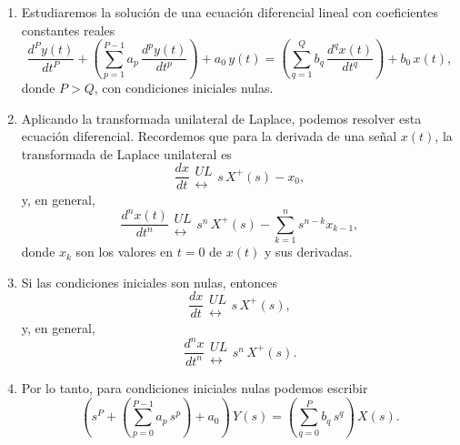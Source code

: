 \begin{enumerate}

\item Estudiaremos la soluci\'{o}n de una ecuaci\'{o}n diferencial lineal con coeficientes constantes reales
\begin{equation}
   \frac{d^{P}y\left( t\right) }{dt^{P}} +
   \left(\sum_{p=1}^{P-1}a_{p} \, \frac{d^{p}y\left( t\right) }{dt^{p}}\right) + a_{0} \, y(t)= 
     \left(\sum_{q=1}^{Q}b_{q} \, \frac{d^{q}x\left( t\right) }{dt^{q}}\right)  + b_{0} \, x(t),
\end{equation}
donde $P > Q$, con condiciones iniciales nulas.

\item Aplicando la transformada unilateral de Laplace, podemos resolver esta ecuaci\'{o}n diferencial.
Recordemos que para la derivada de una se\~{n}al $x(t)$, la transformada de Laplace unilateral es
\begin{equation}
  \frac{dx}{dt} \begin{array}{c} UL \\ \leftrightarrow \end{array} s \, X^{+}(s) - x_{0},
\end{equation}
y, en general,
\begin{equation}
  \frac{d^{n}x(t)}{dt^{n}} \begin{array}{c} UL \\ \leftrightarrow \end{array}
  s^{n} \, X^{+}(s) - \sum_{k=1}^{n} s^{n-k} x_{k-1},
\end{equation}
donde $x_{k}$ son los valores en $t = 0$ de $x(t)$ y sus derivadas. 

\item Si las condiciones iniciales son nulas, entonces
\begin{equation}
  \frac{dx}{dt} \begin{array}{c} UL \\ \leftrightarrow \end{array} s \, X^{+}(s),
\end{equation}
y, en general,
\begin{equation}
  \frac{d^{n}x}{dt^{n}} \begin{array}{c} UL \\ \leftrightarrow \end{array}
  s^{n} \, X^{+}(s).
\end{equation}

\item Por lo tanto, para condiciones iniciales nulas podemos escribir
\begin{equation}
    \left(s^{P} + 
   \left(\sum_{p=0}^{P-1} a_{p} \, s^{p}\right) + a_{0} \right) \, Y(s) = 
     \left(\sum_{q=0}^{P} b_{q} \, s^{q} \right) \, X(s).
\end{equation}


\end{enumerate}
